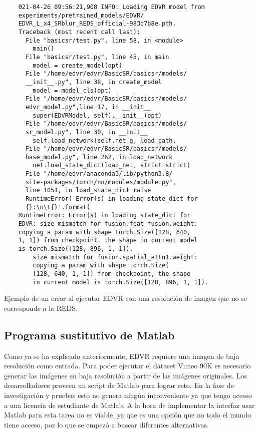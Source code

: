     \begin{verbatim}
    021-04-26 09:56:21,908 INFO: Loading EDVR model from
    experiments/pretrained_models/EDVR/
    EDVR_L_x4_SRblur_REDS_official-983d7b8e.pth.
    Traceback (most recent call last):
      File "basicsr/test.py", line 58, in <module>
        main()
      File "basicsr/test.py", line 45, in main
        model = create_model(opt)
      File "/home/edvr/edvr/BasicSR/basicsr/models/
      __init__.py", line 38, in create_model
        model = model_cls(opt)
      File "/home/edvr/edvr/BasicSR/basicsr/models/
      edvr_model.py",line 17, in __init__
        super(EDVRModel, self).__init__(opt)
      File "/home/edvr/edvr/BasicSR/basicsr/models/
      sr_model.py", line 30, in __init__
        self.load_network(self.net_g, load_path,
      File "/home/edvr/edvr/BasicSR/basicsr/models/
      base_model.py", line 262, in load_network
        net.load_state_dict(load_net, strict=strict)
      File "/home/edvr/anaconda3/lib/python3.8/
      site-packages/torch/nn/modules/module.py",
      line 1051, in load_state_dict raise
      RuntimeError('Error(s) in loading state_dict for 
      {}:\n\t{}'.format(
    RuntimeError: Error(s) in loading state_dict for 
    EDVR: size mismatch for fusion.feat_fusion.weight:
    copying a param with shape torch.Size([128, 640,
    1, 1]) from checkpoint, the shape in current model 
    is torch.Size([128, 896, 1, 1]).
    	size mismatch for fusion.spatial_attn1.weight:
    	copying a param with shape torch.Size(
    	[128, 640, 1, 1]) from checkpoint, the shape
    	in current model is torch.Size([128, 896, 1, 1]).
    \end{verbatim}
    Ejemplo de un error al ejecutar EDVR con una resolución de imagen que no se corresponde a la REDS.
    
    \subsection {Programa sustitutivo de Matlab}
    Como ya se ha explicado anteriormente, EDVR requiere una imagen de baja resolución como entrada. Para poder ejecutar el dataset Vimeo 90K es necesario generar las imágenes en baja resolución a partir de las imágenes originales. Los desarrolladores proveen un script de Matlab para lograr esto. En la fase de investigación y pruebas esto no genera ningún inconveniente ya que tengo acceso a una licencia de estudiante de Matlab. A la hora de implementar la interfaz usar Matlab para esta tarea no es viable, ya que es una opción que no todo el  mundo tiene acceso, por lo que se empezó a buscar diferentes alternativas.

